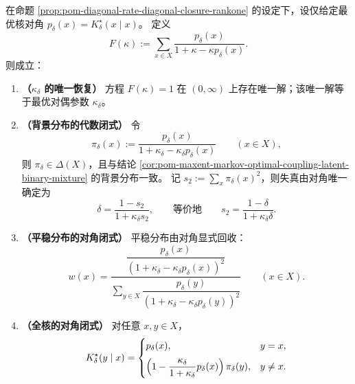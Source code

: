 \begin{theorem}\label{thm:pom-diagonal-rate-diagonal-statistics-complete}
在命题 \ref{prop:pom-diagonal-rate-diagonal-closure-rankone} 的设定下，设仅给定最优核对角
\(
p_\delta(x)=K^\star_\delta(x\mid x)
\)。
定义
\[
F(\kappa):=\sum_{x\in X}\frac{p_\delta(x)}{1+\kappa-\kappa p_\delta(x)}.
\]
则成立：
\begin{enumerate}
  \item \textbf{（\(\kappa_\delta\) 的唯一恢复）}
  方程 \(F(\kappa)=1\) 在 \((0,\infty)\) 上存在唯一解；该唯一解等于最优对偶参数 \(\kappa_\delta\)。

  \item \textbf{（背景分布的代数闭式）}
  令
  \[
  \pi_\delta(x):=\frac{p_\delta(x)}{1+\kappa_\delta-\kappa_\delta p_\delta(x)}\qquad(x\in X),
  \]
  则 \(\pi_\delta\in\Delta(X)\)，且与结论 \ref{cor:pom-maxent-markov-optimal-coupling-latent-binary-mixture} 的背景分布一致。
  记 \(s_2:=\sum_x \pi_\delta(x)^2\)，则失真由对角唯一确定为
  \[
  \delta=\frac{1-s_2}{1+\kappa_\delta s_2},
  \qquad\text{等价地}\qquad
  s_2=\frac{1-\delta}{1+\kappa_\delta\delta}.
  \]

  \item \textbf{（平稳分布的对角闭式）}
  平稳分布由对角显式回收：
  \[
  w(x)=\frac{\dfrac{p_\delta(x)}{(1+\kappa_\delta-\kappa_\delta p_\delta(x))^{2}}}{\sum_{y\in X}\dfrac{p_\delta(y)}{(1+\kappa_\delta-\kappa_\delta p_\delta(y))^{2}}}\qquad(x\in X).
  \]

  \item \textbf{（全核的对角闭式）}
  对任意 \(x,y\in X\)，
  \[
  K^\star_\delta(y\mid x)=
  \begin{cases}
  p_\delta(x),&y=x,\\[6pt]
  \Bigl(1-\dfrac{\kappa_\delta}{1+\kappa_\delta}p_\delta(x)\Bigr)\,\pi_\delta(y),&y\ne x.
  \end{cases}
  \]
\end{enumerate}
\end{theorem}
